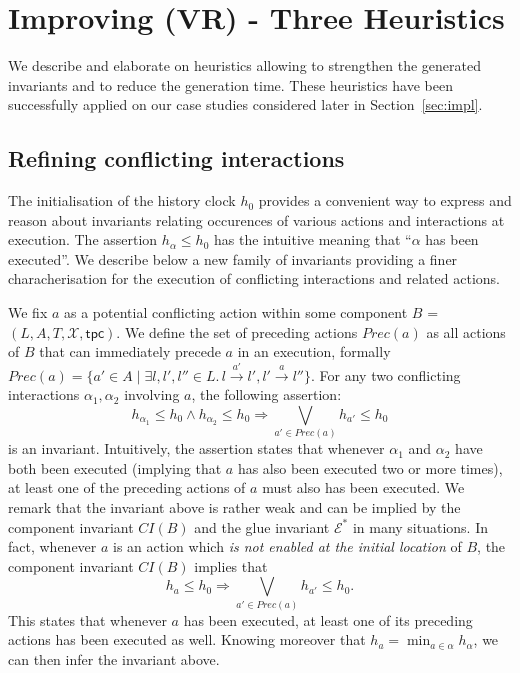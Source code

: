 \documentclass{LMCS}
\newcommand{\X}{\mathcal{X}}
\newcommand{\inv}{\mathsf{tpc}}
\newcommand{\transit}[1]{\stackrel{#1}{\rightarrow}}
\newcommand{\te}{h_0}
\theoremstyle{plain}\newtheorem{remark}[thm]{Remark}
\theoremstyle{plain}\newtheorem{example}[thm]{Example}
\begin{document}
\section{Improving (VR) - Three Heuristics}
\label{sec:heuristics}

We describe and elaborate on heuristics allowing to strengthen the
generated invariants and to reduce the generation time. These
heuristics have been successfully applied on our case studies
considered later in Section~\ref{sec:impl}.


\subsection{Refining conflicting interactions}
\label{sec:h0inv}

The initialisation of the history clock $\te$ provides a convenient
way to express and reason about invariants relating occurences of
various actions and interactions at execution.  The assertion
$h_\alpha \leq \te$ has the intuitive meaning that ``$\alpha$ has been
executed''.  We describe below a new family of invariants providing a
finer characherisation for the execution of conflicting interactions
and related actions.

We fix $a$ as a potential conflicting action within some component $B$
= $(L, A, T, \X, \inv)$. We define the set of preceding actions
$Prec(a)$ as all actions of $B$ that can immediately precede $a$ in an
execution, formally $Prec(a) = \{a'\in A \mid \exists l, l', l'' \in
L. \, l \transit{a'} l', l'\transit{a} l''\}$. For any two conflicting
interactions $\alpha_1, \alpha_2$ involving $a$, the following
assertion:
\[ h_{\alpha_1} \leq \te \wedge h_{\alpha_2} \leq \te \Rightarrow
\bigvee\limits_{a'\in Prec(a)} h_{a'} \leq \te \] is an
invariant. Intuitively, the assertion states that whenever $\alpha_1$
and $\alpha_2$ have both been executed (implying that $a$ has also
been executed two or more times), at least one of the preceding
actions of $a$ must also has been executed. We remark that the
invariant above is rather weak and can be implied by the component
invariant $CI(B)$ and the glue invariant $\mathcal{E}^{*}$ in many
situations. In fact, whenever $a$ is an action which {\em is not
  enabled at the initial location} of $B$, the component invariant
$CI(B)$ implies that
\[h_a \leq \te \Rightarrow \bigvee\limits_{a'\in Prec(a)} h_{a'} \leq
\te.\] This states that whenever $a$ has been executed, at least one
of its preceding actions has been executed as well. Knowing moreover
that $h_a = \min_{a \in \alpha} h_\alpha$, we can then infer the
invariant above.
\end{document}
